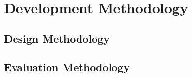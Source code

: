\section{Development Methodology}

\subsection{Design Methodology}

\subsection{Evaluation Methodology}
